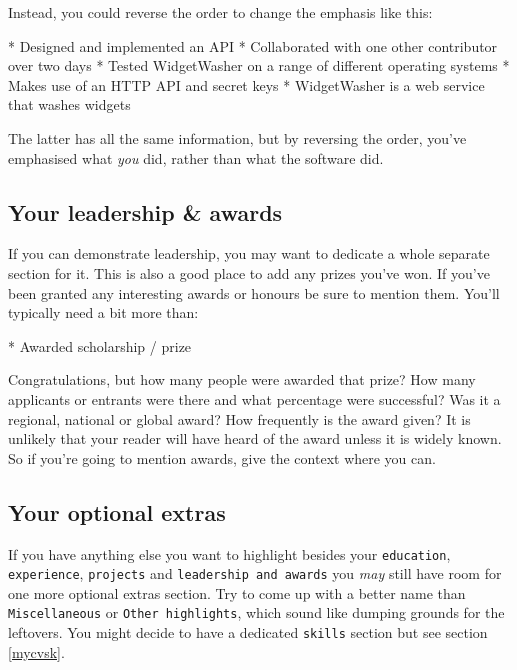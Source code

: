 \documentclass[
]{book}
\newenvironment{Shaded}{\begin{snugshade}}{\end{snugshade}}
\newcommand{\NormalTok}[1]{#1}
\newcommand{\SpecialStringTok}[1]{\textcolor[rgb]{0.31,0.60,0.02}{#1}}
\begin{document}
Instead, you could reverse the order to change the emphasis like this:

\begin{Shaded}
\begin{Highlighting}[]
\SpecialStringTok{* }\NormalTok{Designed and implemented an API}
\SpecialStringTok{* }\NormalTok{Collaborated with one other contributor over two days}
\SpecialStringTok{* }\NormalTok{Tested WidgetWasher on a range of different operating systems}
\SpecialStringTok{* }\NormalTok{Makes use of an HTTP API and secret keys}
\SpecialStringTok{* }\NormalTok{WidgetWasher is a web service that washes widgets}
\end{Highlighting}
\end{Shaded}

The latter has all the same information, but by reversing the order, you've emphasised what \emph{you} did, rather than what the software did.

\hypertarget{prizes}{%
\subsection{Your leadership \& awards}\label{prizes}}

If you can demonstrate leadership, you may want to dedicate a whole separate section for it. This is also a good place to add any prizes you've won. If you've been granted any interesting awards or honours be sure to mention them. You'll typically need a bit more than:

\begin{Shaded}
\begin{Highlighting}[]
\SpecialStringTok{* }\NormalTok{Awarded scholarship / prize}
\end{Highlighting}
\end{Shaded}

Congratulations, but how many people were awarded that prize? How many applicants or entrants were there and what percentage were successful? Was it a regional, national or global award? How frequently is the award given? It is unlikely that your reader will have heard of the award unless it is widely known. So if you're going to mention awards, give the context where you can.

\hypertarget{misc}{%
\subsection{Your optional extras}\label{misc}}

If you have anything else you want to highlight besides your \texttt{education}, \texttt{experience}, \texttt{projects} and \texttt{leadership\ and\ awards} you \emph{may} still have room for one more optional extras section. Try to come up with a better name than \texttt{Miscellaneous} or \texttt{Other\ highlights}, which sound like dumping grounds for the leftovers. You might decide to have a dedicated \texttt{skills} section but see section \ref{mycvsk}.
\end{document}
